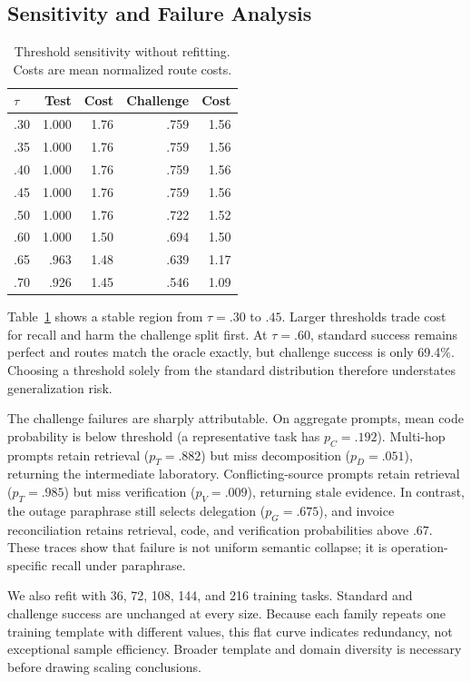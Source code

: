 \documentclass[letterpaper]{article} %
\begin{document}
\subsection{Sensitivity and Failure Analysis}

\begin{table}[t]
\centering
\small
\caption{Threshold sensitivity without refitting. Costs are mean normalized route costs.}
\label{tab:sensitivity}
\begin{tabular}{lrrrr}
\toprule
$\tau$ & Test & Cost & Challenge & Cost \\
\midrule
.30 & 1.000 & 1.76 & .759 & 1.56 \\
.35 & 1.000 & 1.76 & .759 & 1.56 \\
.40 & 1.000 & 1.76 & .759 & 1.56 \\
.45 & 1.000 & 1.76 & .759 & 1.56 \\
.50 & 1.000 & 1.76 & .722 & 1.52 \\
.60 & 1.000 & 1.50 & .694 & 1.50 \\
.65 & .963 & 1.48 & .639 & 1.17 \\
.70 & .926 & 1.45 & .546 & 1.09 \\
\bottomrule
\end{tabular}
\end{table}

Table~\ref{tab:sensitivity} shows a stable region from $\tau=.30$ to $.45$. Larger thresholds trade cost for recall and harm the challenge split first. At $\tau=.60$, standard success remains perfect and routes match the oracle exactly, but challenge success is only 69.4\%. Choosing a threshold solely from the standard distribution therefore understates generalization risk.

The challenge failures are sharply attributable. On aggregate prompts, mean code probability is below threshold (a representative task has $p_C=.192$). Multi-hop prompts retain retrieval ($p_T=.882$) but miss decomposition ($p_D=.051$), returning the intermediate laboratory. Conflicting-source prompts retain retrieval ($p_T=.985$) but miss verification ($p_V=.009$), returning stale evidence. In contrast, the outage paraphrase still selects delegation ($p_G=.675$), and invoice reconciliation retains retrieval, code, and verification probabilities above $.67$. These traces show that failure is not uniform semantic collapse; it is operation-specific recall under paraphrase.

We also refit with 36, 72, 108, 144, and 216 training tasks. Standard and challenge success are unchanged at every size. Because each family repeats one training template with different values, this flat curve indicates redundancy, not exceptional sample efficiency. Broader template and domain diversity is necessary before drawing scaling conclusions.
\end{document}
